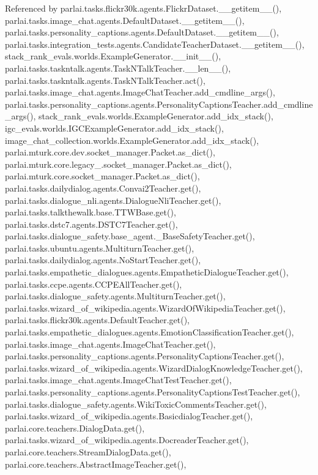 Referenced by parlai.\+tasks.\+flickr30k.\+agents.\+Flickr\+Dataset.\+\_\+\+\_\+getitem\+\_\+\+\_\+(), parlai.\+tasks.\+image\+\_\+chat.\+agents.\+Default\+Dataset.\+\_\+\+\_\+getitem\+\_\+\+\_\+(), parlai.\+tasks.\+personality\+\_\+captions.\+agents.\+Default\+Dataset.\+\_\+\+\_\+getitem\+\_\+\+\_\+(), parlai.\+tasks.\+integration\+\_\+tests.\+agents.\+Candidate\+Teacher\+Dataset.\+\_\+\+\_\+getitem\+\_\+\+\_\+(), stack\+\_\+rank\+\_\+evals.\+worlds.\+Example\+Generator.\+\_\+\+\_\+init\+\_\+\+\_\+(), parlai.\+tasks.\+taskntalk.\+agents.\+Task\+N\+Talk\+Teacher.\+\_\+\+\_\+len\+\_\+\+\_\+(), parlai.\+tasks.\+taskntalk.\+agents.\+Task\+N\+Talk\+Teacher.\+act(), parlai.\+tasks.\+image\+\_\+chat.\+agents.\+Image\+Chat\+Teacher.\+add\+\_\+cmdline\+\_\+args(), parlai.\+tasks.\+personality\+\_\+captions.\+agents.\+Personality\+Captions\+Teacher.\+add\+\_\+cmdline\+\_\+args(), stack\+\_\+rank\+\_\+evals.\+worlds.\+Example\+Generator.\+add\+\_\+idx\+\_\+stack(), igc\+\_\+evals.\+worlds.\+I\+G\+C\+Example\+Generator.\+add\+\_\+idx\+\_\+stack(), image\+\_\+chat\+\_\+collection.\+worlds.\+Example\+Generator.\+add\+\_\+idx\+\_\+stack(), parlai.\+mturk.\+core.\+dev.\+socket\+\_\+manager.\+Packet.\+as\+\_\+dict(), parlai.\+mturk.\+core.\+legacy\+\_.\+socket\+\_\+manager.\+Packet.\+as\+\_\+dict(), parlai.\+mturk.\+core.\+socket\+\_\+manager.\+Packet.\+as\+\_\+dict(), parlai.\+tasks.\+dailydialog.\+agents.\+Convai2\+Teacher.\+get(), parlai.\+tasks.\+dialogue\+\_\+nli.\+agents.\+Dialogue\+Nli\+Teacher.\+get(), parlai.\+tasks.\+talkthewalk.\+base.\+T\+T\+W\+Base.\+get(), parlai.\+tasks.\+dstc7.\+agents.\+D\+S\+T\+C7\+Teacher.\+get(), parlai.\+tasks.\+dialogue\+\_\+safety.\+base\+\_\+agent.\+\_\+\+Base\+Safety\+Teacher.\+get(), parlai.\+tasks.\+ubuntu.\+agents.\+Multiturn\+Teacher.\+get(), parlai.\+tasks.\+dailydialog.\+agents.\+No\+Start\+Teacher.\+get(), parlai.\+tasks.\+empathetic\+\_\+dialogues.\+agents.\+Empathetic\+Dialogue\+Teacher.\+get(), parlai.\+tasks.\+ccpe.\+agents.\+C\+C\+P\+E\+All\+Teacher.\+get(), parlai.\+tasks.\+dialogue\+\_\+safety.\+agents.\+Multiturn\+Teacher.\+get(), parlai.\+tasks.\+wizard\+\_\+of\+\_\+wikipedia.\+agents.\+Wizard\+Of\+Wikipedia\+Teacher.\+get(), parlai.\+tasks.\+flickr30k.\+agents.\+Default\+Teacher.\+get(), parlai.\+tasks.\+empathetic\+\_\+dialogues.\+agents.\+Emotion\+Classification\+Teacher.\+get(), parlai.\+tasks.\+image\+\_\+chat.\+agents.\+Image\+Chat\+Teacher.\+get(), parlai.\+tasks.\+personality\+\_\+captions.\+agents.\+Personality\+Captions\+Teacher.\+get(), parlai.\+tasks.\+wizard\+\_\+of\+\_\+wikipedia.\+agents.\+Wizard\+Dialog\+Knowledge\+Teacher.\+get(), parlai.\+tasks.\+image\+\_\+chat.\+agents.\+Image\+Chat\+Test\+Teacher.\+get(), parlai.\+tasks.\+personality\+\_\+captions.\+agents.\+Personality\+Captions\+Test\+Teacher.\+get(), parlai.\+tasks.\+dialogue\+\_\+safety.\+agents.\+Wiki\+Toxic\+Comments\+Teacher.\+get(), parlai.\+tasks.\+wizard\+\_\+of\+\_\+wikipedia.\+agents.\+Basicdialog\+Teacher.\+get(), parlai.\+core.\+teachers.\+Dialog\+Data.\+get(), parlai.\+tasks.\+wizard\+\_\+of\+\_\+wikipedia.\+agents.\+Docreader\+Teacher.\+get(), parlai.\+core.\+teachers.\+Stream\+Dialog\+Data.\+get(), parlai.\+core.\+teachers.\+Abstract\+Image\+Teacher.\+get(), 